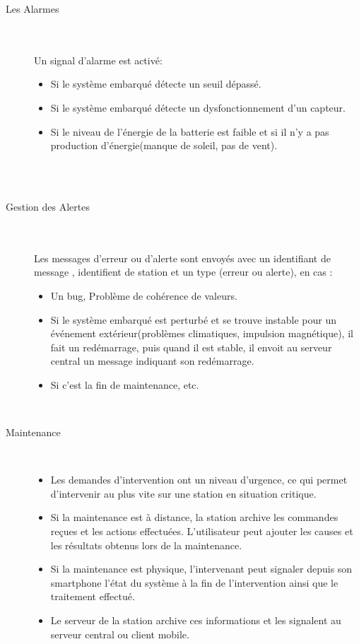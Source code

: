 \begin{description}
\item [Les Alarmes]\hfill\\
	\\ Un signal d'alarme est activé:\\
	\begin{itemize}
		\item Si le système embarqué détecte un seuil dépassé.\\
		\item Si le système embarqué détecte un dysfonctionnement d'un capteur.\\
		\item Si le niveau de l'énergie de la batterie est faible et si il n'y 
        a pas production d'énergie(manque de soleil, pas de vent).\\
	\end{itemize}\\
\hfill\\
\item [Gestion des Alertes]\hfill\\
	\\ Les messages d'erreur ou d'alerte sont envoyés avec un identifiant de 
       message , identifient de station et un type (erreur ou alerte), en cas :\\
		\begin{itemize}
		\item Un bug, Problème de cohérence de valeurs.\\
		\item Si le système embarqué est perturbé et se trouve instable pour un 
        événement extérieur(problèmes climatiques, impulsion magnétique), il 
        fait un redémarrage, puis quand il est stable, il envoit au serveur 
        central un message indiquant son redémarrage.  \\
		\item Si c'est la fin de maintenance, etc.
	\end{itemize}
\hfill\\
\item [Maintenance]\hfill\\
	\begin{itemize}
	\item Les demandes d'intervention ont un niveau d'urgence, ce qui permet 
    d'intervenir au plus vite sur une station en situation critique.\\
	\item Si la maintenance est à distance, la station archive les commandes 
    reçues et les actions effectuées. L'utilisateur peut ajouter les causes et 
    les résultats obtenus lors de la maintenance.\\
	\item Si la maintenance est physique, l'intervenant peut signaler depuis 
    son smartphone l'état du système à la fin de l'intervention ainsi que le 
    traitement effectué. \\
	\item Le serveur de la station archive ces informations et les signalent 
    au serveur central ou client mobile.\\
	\end{itemize}

\end{description}	

